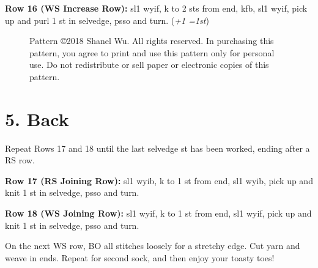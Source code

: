 \documentclass[12pt]{article}
\newcommand{\rowDir}[1]{\textbf{#1:}} %
\newcommand{\increase}[1]{(\emph{+#1 
	\ifnum#1=1{st}\else{sts}\fi})}
\newenvironment{frnote}
    {%
    	\setlength{\FrameRule}{1.5pt}
    	\def\FrameCommand{\fboxrule=\FrameRule\fboxsep=\FrameSep \fcolorbox{framecolor}{shadecolor}}
    	\MakeFramed {\FrameRestore}}
    {\setlength{\FrameRule}{1pt}
	\endMakeFramed}
\begin{document}
\rowDir{Row 16 (WS Increase Row)} sl1 wyif, k to 2 sts from end, kfb, sl1 wyif, pick up and purl 1 st in selvedge, psso and turn. \increase{1}

\begin{figure}
\vspace{-2em}
\begin{frnote} \ssmall
Pattern \copyright 2018 Shanel Wu. All rights reserved. In purchasing this pattern, you agree to print and use this pattern only for personal use. Do not redistribute or sell paper or electronic copies of this pattern.
\end{frnote}
\vspace{-5em}
\end{figure} \leavevmode

\section*{5. Back}

Repeat Rows 17 and 18 until the last selvedge st has been worked, ending after a RS row.



\rowDir{Row 17 (RS Joining Row)} sl1 wyib, k to 1 st from end, sl1 wyib, pick up and knit 1 st in selvedge, psso and turn.

\rowDir{Row 18 (WS Joining Row)} sl1 wyif, k to 1 st from end, sl1 wyif, pick up and knit 1 st in selvedge, psso and turn.

On the next WS row, BO all stitches loosely for a stretchy edge. Cut yarn and weave in ends. Repeat for second sock, and then enjoy your toasty toes!



\end{document}
